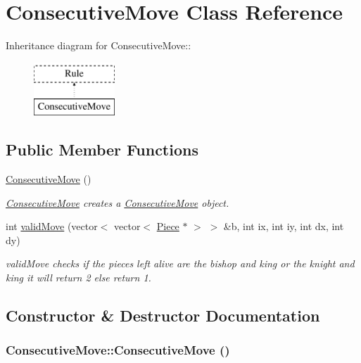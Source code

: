 \hypertarget{classConsecutiveMove}{
\section{ConsecutiveMove Class Reference}
\label{classConsecutiveMove}
}
Inheritance diagram for ConsecutiveMove::\begin{figure}[H]
\begin{center}
\leavevmode
\includegraphics[height=2cm]{classConsecutiveMove}
\end{center}
\end{figure}
\subsection*{Public Member Functions}
\begin{DoxyCompactItemize}
\item 
\hyperlink{classConsecutiveMove_a46221ac47cb9051830e1799d5a29604e}{ConsecutiveMove} ()
\begin{DoxyCompactList}\small\item\em \hyperlink{classConsecutiveMove}{ConsecutiveMove} creates a \hyperlink{classConsecutiveMove}{ConsecutiveMove} object. \item\end{DoxyCompactList}\item 
\hypertarget{classConsecutiveMove_aa44597e9e07562a16042210fe1b9f090}{
int \hyperlink{classConsecutiveMove_aa44597e9e07562a16042210fe1b9f090}{validMove} (vector$<$ vector$<$ \hyperlink{classPiece}{Piece} $\ast$ $>$ $>$ \&b, int ix, int iy, int dx, int dy)}
\label{classConsecutiveMove_aa44597e9e07562a16042210fe1b9f090}

\begin{DoxyCompactList}\small\item\em validMove checks if the pieces left alive are the bishop and king or the knight and king it will return 2 else return 1. \item\end{DoxyCompactList}\end{DoxyCompactItemize}


\subsection{Constructor \& Destructor Documentation}
\hypertarget{classConsecutiveMove_a46221ac47cb9051830e1799d5a29604e}{
\subsubsection[{ConsecutiveMove}]{\setlength{\rightskip}{0pt plus 5cm}ConsecutiveMove::ConsecutiveMove ()}}
\label{classConsecutiveMove_a46221ac47cb9051830e1799d5a29604e}


